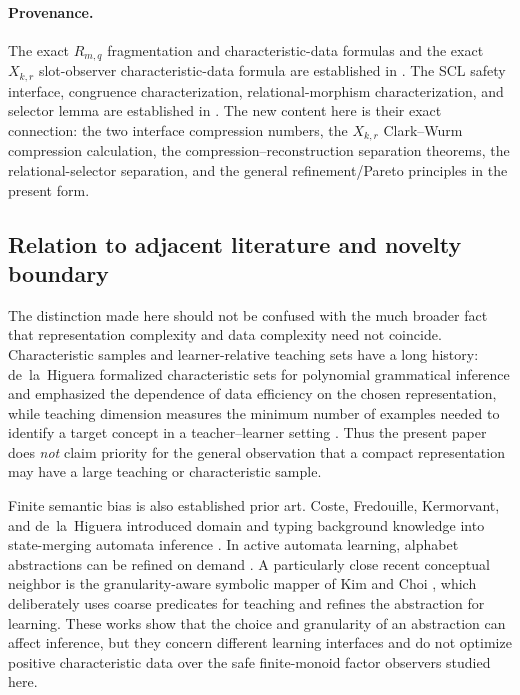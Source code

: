 \documentclass[11pt]{article}
\theoremstyle{definition}
\theoremstyle{remark}
\begin{document}
\paragraph{Provenance.}
The exact $R_{m,q}$ fragmentation and characteristic-data formulas and the
exact $X_{k,r}$ slot-observer characteristic-data formula are established in
\cite{KuriyamaOFET}.  The SCL safety interface, congruence characterization,
relational-morphism characterization, and selector lemma are established in
\cite{KuriyamaSCL}.  The new content here is their exact connection: the two
interface compression numbers, the $X_{k,r}$ Clark--Wurm compression
calculation, the compression--reconstruction separation theorems, the
relational-selector separation, and the general refinement/Pareto principles
in the present form.


\subsection*{Relation to adjacent literature and novelty boundary}

The distinction made here should not be confused with the much broader fact
that representation complexity and data complexity need not coincide.
Characteristic samples and learner-relative teaching sets have a long history:
de~la~Higuera formalized characteristic sets for polynomial grammatical
inference and emphasized the dependence of data efficiency on the chosen
representation, while teaching dimension measures the minimum number of
examples needed to identify a target concept in a teacher--learner setting
\cite{Higuera1997,GoldmanKearns1995}.  Thus the present paper does \emph{not}
claim priority for the general observation that a compact representation may
have a large teaching or characteristic sample.

Finite semantic bias is also established prior art.  Coste, Fredouille,
Kermorvant, and de~la~Higuera introduced domain and typing background
knowledge into state-merging automata inference \cite{CosteEtAl2004}.
In active automata learning, alphabet abstractions can be refined on demand
\cite{HowarEtAl2011,AartsEtAl2012}.  A particularly close recent conceptual
neighbor is the granularity-aware symbolic mapper of Kim and Choi
\cite{KimChoi2026}, which deliberately uses coarse predicates for teaching
and refines the abstraction for learning.  These works show that the choice
and granularity of an abstraction can affect inference, but they concern
different learning interfaces and do not optimize positive characteristic
data over the safe finite-monoid factor observers studied here.
\end{document}
